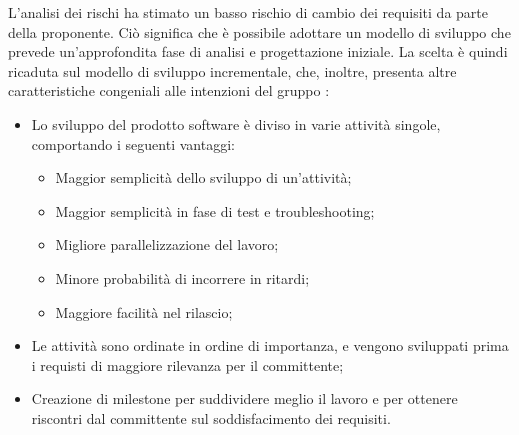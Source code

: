 L'analisi dei rischi ha stimato un basso rischio di cambio dei requisiti da parte della proponente.
Ciò significa che è possibile adottare un modello di sviluppo che prevede un'approfondita fase di 
analisi e progettazione iniziale.
La scelta è quindi ricaduta sul modello di sviluppo incrementale, che, inoltre, presenta altre
caratteristiche congeniali alle intenzioni del gruppo \gruppo \space :
\begin{itemize}
    \item Lo sviluppo del prodotto software è diviso in varie attività singole, comportando i seguenti vantaggi:
    \begin{itemize}
    	\item Maggior semplicità dello sviluppo di un'attività;
    	\item Maggior semplicità in fase di test e troubleshooting;
    	\item Migliore parallelizzazione del lavoro;
    	\item Minore probabilità di incorrere in ritardi;
    	\item Maggiore facilità nel rilascio;
    \end{itemize}
    \item Le attività sono ordinate in ordine di importanza, e vengono sviluppati prima i requisti di maggiore rilevanza per il committente;
    \item Creazione di {milestone} per suddividere meglio il lavoro e per ottenere riscontri dal committente sul soddisfacimento dei requisiti.
\end{itemize}